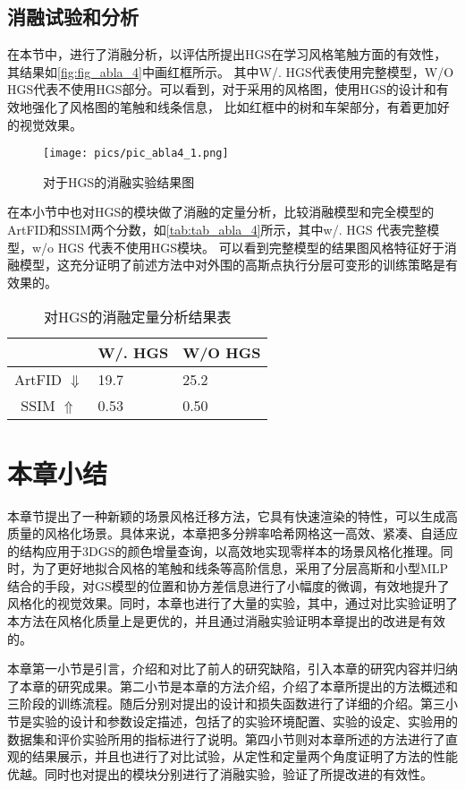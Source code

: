 \subsection{消融试验和分析}
在本节中，进行了消融分析，以评估所提出HGS在学习风格笔触方面的有效性，其结果如\autoref{fig:fig_abla_4}中画红框所示。
其中W/. HGS代表使用完整模型，W/O HGS代表不使用HGS部分。可以看到，对于采用的风格图，使用HGS的设计和有效地强化了风格图的笔触和线条信息，
比如红框中的树和车架部分，有着更加好的视觉效果。

\begin{figure}[htb]
    \centering
    \texttt{[image: pics/pic\_abla4\_1.png]}
    \caption{\label{fig:fig_abla_4}对于HGS的消融实验结果图}
\end{figure}

\par 在本小节中也对HGS的模块做了消融的定量分析，比较消融模型和完全模型的ArtFID和SSIM两个分数，如\autoref{tab:tab_abla_4}所示，其中w/. HGS 代表完整模型，w/o HGS 代表不使用HGS模块。
可以看到完整模型的结果图风格特征好于消融模型，这充分证明了前述方法中对外围的高斯点执行分层可变形的训练策略是有效果的。
\begin{table}[htb]
    \caption{\label{tab:tab_abla_4}对HGS的消融定量分析结果表}
    \begin{tabularx}{\linewidth}{c  X<{\centering} X<{\centering}}
        \hline
          & W/. HGS & W/O HGS \\ \hline
        ArtFID $\Downarrow$  & 19.7 & 25.2 \\ 
        SSIM $\Uparrow$  & 0.53 &  0.50 \\ \hline
    \end{tabularx}
\end{table}
\newpage
\section{本章小结}
本章节提出了一种新颖的场景风格迁移方法，它具有快速渲染的特性，可以生成高质量的风格化场景。具体来说，本章把多分辨率哈希网格这一高效、紧凑、自适应的结构应用于3DGS的颜色增量查询，以高效地实现零样本的场景风格化推理。同时，为了更好地拟合风格的笔触和线条等高阶信息，采用了分层高斯和小型MLP结合的手段，对GS模型的位置和协方差信息进行了小幅度的微调，有效地提升了风格化的视觉效果。同时，本章也进行了大量的实验，其中，通过对比实验证明了本方法在风格化质量上是更优的，并且通过消融实验证明本章提出的改进是有效的。
\par 本章第一小节是引言，介绍和对比了前人的研究缺陷，引入本章的研究内容并归纳了本章的研究成果。第二小节是本章的方法介绍，介绍了本章所提出的方法概述和三阶段的训练流程。随后分别对提出的设计和损失函数进行了详细的介绍。第三小节是实验的设计和参数设定描述，包括了的实验环境配置、实验的设定、实验用的数据集和评价实验所用的指标进行了说明。第四小节则对本章所述的方法进行了直观的结果展示，并且也进行了对比试验，从定性和定量两个角度证明了方法的性能优越。同时也对提出的模块分别进行了消融实验，验证了所提改进的有效性。
